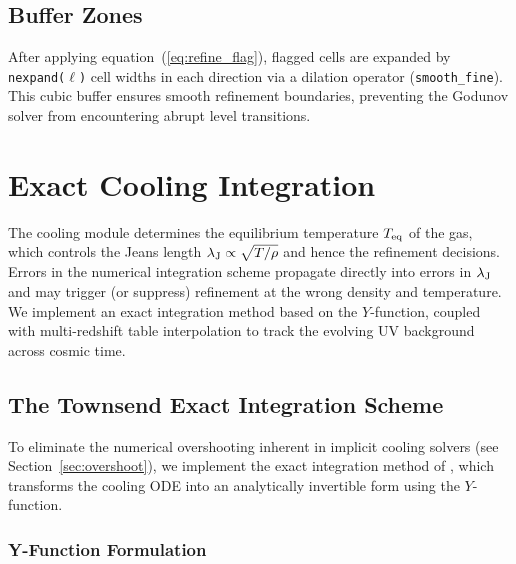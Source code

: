 \documentclass[fleqn,usenatbib]{mnras}
\newcommand{\lJ}{\lambda_{\rm J}}
\newcommand{\code}[1]{\texttt{#1}}
\begin{document}
\subsection{Buffer Zones}

After applying equation~(\ref{eq:refine_flag}), flagged cells are
expanded by \code{nexpand($\ell$)} cell widths in each direction via a
dilation operator (\code{smooth\_fine}).
This cubic buffer ensures smooth refinement boundaries, preventing
the Godunov solver from encountering abrupt level transitions.


\section{Exact Cooling Integration}
\label{sec:exact_cooling}

The cooling module determines the equilibrium temperature $T_{\rm eq}$
of the gas, which controls the Jeans length
$\lJ \propto \sqrt{T/\rho}$ and hence the refinement decisions.
Errors in the numerical integration scheme propagate directly into
errors in $\lJ$ and may trigger (or suppress) refinement at the wrong
density and temperature.  We implement an exact integration method
based on the \citet{Townsend2009} $Y$-function, coupled with
multi-redshift table interpolation to track the evolving UV background
across cosmic time.


\subsection{The Townsend Exact Integration Scheme}
\label{sec:townsend}

To eliminate the numerical overshooting inherent in implicit
cooling solvers (see Section~\ref{sec:overshoot}), we implement the exact integration
method of \citet{Townsend2009}, which transforms the cooling ODE into
an analytically invertible form using the $Y$-function.

\subsubsection{Y-Function Formulation}
\end{document}
